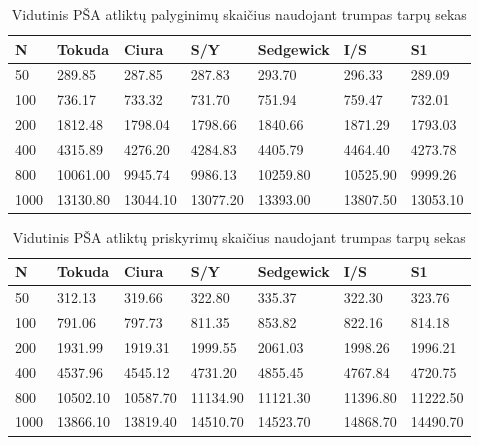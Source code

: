 \documentclass{VUMIFInfKursinis}
\begin{document}
\begin{table}[H]
  \caption{Vidutinis PŠA atliktų palyginimų skaičius naudojant trumpas tarpų sekas}
  \label{iss_small_comparisons}
  \begin{tabular}{|l|l|l|l|l|l|l|}
  \hline
  N    & Tokuda   & Ciura    & S/Y      & Sedgewick & I/S      & S1       \\ \hline
  50   & 289.85   & 287.85   & 287.83   & 293.70    & 296.33   & 289.09   \\ \hline
  100  & 736.17   & 733.32   & 731.70   & 751.94    & 759.47   & 732.01   \\ \hline
  200  & 1812.48  & 1798.04  & 1798.66  & 1840.66   & 1871.29  & 1793.03  \\ \hline
  400  & 4315.89  & 4276.20  & 4284.83  & 4405.79   & 4464.40  & 4273.78  \\ \hline
  800  & 10061.00 & 9945.74  & 9986.13  & 10259.80  & 10525.90 & 9999.26  \\ \hline
  1000 & 13130.80 & 13044.10 & 13077.20 & 13393.00  & 13807.50 & 13053.10 \\ \hline
  \end{tabular}
  \end{table}

\begin{table}[H]
  \caption{Vidutinis PŠA atliktų priskyrimų skaičius naudojant trumpas tarpų sekas}
  \label{iss_small_assignments}
  \begin{tabular}{|l|l|l|l|l|l|l|}
  \hline
  N    & Tokuda   & Ciura    & S/Y      & Sedgewick & I/S      & S1       \\ \hline
  50   & 312.13   & 319.66   & 322.80   & 335.37    & 322.30   & 323.76   \\ \hline
  100  & 791.06   & 797.73   & 811.35   & 853.82    & 822.16   & 814.18   \\ \hline
  200  & 1931.99  & 1919.31  & 1999.55  & 2061.03   & 1998.26  & 1996.21  \\ \hline
  400  & 4537.96  & 4545.12  & 4731.20  & 4855.45   & 4767.84  & 4720.75  \\ \hline
  800  & 10502.10 & 10587.70 & 11134.90 & 11121.30  & 11396.80 & 11222.50 \\ \hline
  1000 & 13866.10 & 13819.40 & 14510.70 & 14523.70  & 14868.70 & 14490.70 \\ \hline
  \end{tabular}
  \end{table}
\end{document}

